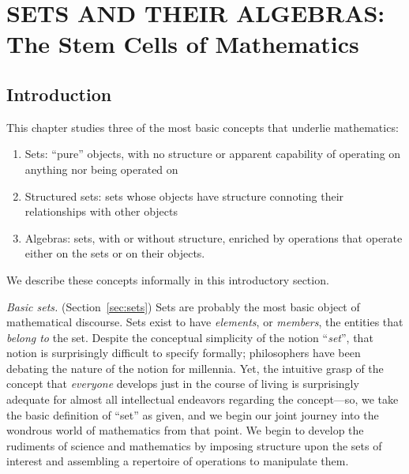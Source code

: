 
\chapter{SETS AND THEIR ALGEBRAS: \\
The Stem Cells of Mathematics}
\label{ch:sets-BA-logic}



\section{Introduction}

This chapter studies three of the most basic concepts that underlie
mathematics:
\begin{enumerate}
\item
Sets: ``pure'' objects, with no structure or apparent capability of
operating on anything nor being operated on
\item
Structured sets: sets whose objects have structure connoting their
relationships with other objects
\item
Algebras: sets, with or without structure, enriched by operations that
operate either on the sets or on their objects.
\end{enumerate}
We describe these concepts informally in this introductory section.


\bigskip

{\it Basic sets.}  (Section~\ref{sec:sets}) Sets are
probably the most basic object of mathematical discourse.  Sets exist
to have {\it elements},  or {\it members},
 the entities that {\em belong to} 
 the set.  Despite the conceptual
simplicity of the notion ``{\it set}'', that notion is surprisingly
difficult to specify formally; philosophers have been debating the
nature of the notion for millennia.  Yet, the intuitive grasp of the
concept that {\em everyone} develops just in the course of living is
surprisingly adequate for almost all intellectual endeavors regarding
the concept---so, we take the basic definition of ``set'' as given,
and we begin our joint journey into the wondrous world of mathematics
from that point.  We begin to develop the rudiments of science and
mathematics by imposing structure upon the sets of interest and
assembling a repertoire of operations to manipulate them.

